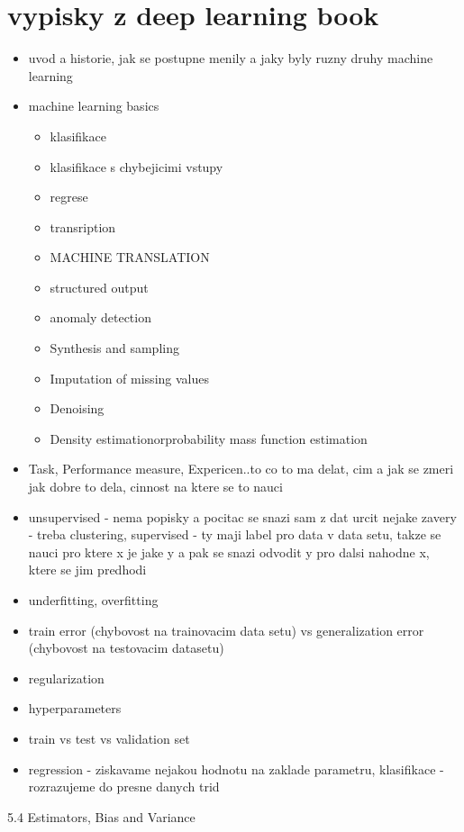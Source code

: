 \section{vypisky z deep learning book}
\begin{itemize}
    \item uvod a historie, jak se postupne menily a jaky byly ruzny druhy machine learning
    \item machine learning basics
    \begin{itemize}
      \item klasifikace
      \item klasifikace s chybejicimi vstupy
      \item regrese
      \item transription
      \item MACHINE TRANSLATION
      \item structured output
      \item anomaly detection
      \item Synthesis and sampling
      \item Imputation of missing values
      \item Denoising
      \item Density estimationorprobability mass function estimation
    \end{itemize}
    \item Task, Performance measure, Expericen..to co to ma delat, cim a jak se zmeri jak dobre to dela, cinnost na ktere se to nauci
    \item unsupervised - nema popisky a pocitac se snazi sam z dat urcit nejake zavery - treba clustering, supervised - ty maji label pro data v data setu, takze se nauci pro ktere x je jake y a pak se snazi odvodit y pro dalsi nahodne x, ktere se jim predhodi
    \item underfitting, overfitting
    \item train error (chybovost na trainovacim data setu) vs generalization error (chybovost na testovacim datasetu)
    \item regularization
    \item hyperparameters
    \item train vs test vs validation set
    \item regression - ziskavame nejakou hodnotu na zaklade parametru, klasifikace - rozrazujeme do presne danych trid
\end{itemize}

5.4 Estimators, Bias and Variance

